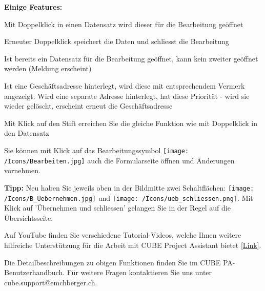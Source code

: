 \textbf{Einige Features:}
\begin{compactitem}
	\item Mit Doppelklick in einen Datensatz wird dieser für die Bearbeitung geöffnet
	\item Erneuter Doppelklick speichert die Daten und schliesst die Bearbeitung
	\item Ist bereits ein Datensatz für die Bearbeitung geöffnet, kann kein zweiter geöffnet werden (Meldung erscheint)
	\item Ist eine Geschäftsadresse hinterlegt, wird diese mit entsprechendem Vermerk angezeigt. Wird eine separate Adresse hinterlegt, hat diese Priorität - wird sie wieder gelöscht, erscheint erneut die Geschäftsadresse
	\item Mit Klick auf den Stift erreichen Sie die gleiche Funktion wie mit Doppelklick in den Datensatz
	\item Sie können mit Klick auf das Bearbeitungssymbol \texttt{[image: /Icons/Bearbeiten.jpg]} auch die Formularseite öffnen und Änderungen vornehmen.
\end{compactitem}

\vspace{\baselineskip}

\textbf{Tipp:} Neu haben Sie jeweils oben in der Bildmitte zwei Schaltflächen: \texttt{[image: /Icons/B\_Uebernehmen.jpg]} und \texttt{[image: /Icons/ueb\_schliessen.png]}. Mit Klick auf 'Übernehmen und schliessen' gelangen Sie in der Regel auf die Übersichtsseite.

\vspace{\baselineskip}

Auf YouTube finden Sie verschiedene Tutorial-Videos, welche Ihnen weitere hilfreiche Unterstützung für die Arbeit mit CUBE Project Assistant bietet \href{https://www.youtube.com/channel/UCYWA8nERo4vTPYWP0WJ32hw}{\color{blue}[Link]}.

\vspace{\baselineskip}

Die Detailbeschreibungen zu obigen Funktionen finden Sie im CUBE PA-Benutzerhandbuch. Für weitere Fragen kontaktieren Sie uns unter {\color{red} cube.support@emchberger.ch}.
